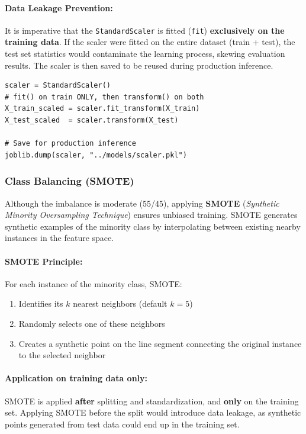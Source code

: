 \documentclass[12pt,a4paper]{article}
\begin{document}
\paragraph{Data Leakage Prevention:} It is imperative that the \texttt{StandardScaler} is fitted (\texttt{fit}) \textbf{exclusively on the training data}. If the scaler were fitted on the entire dataset (train + test), the test set statistics would contaminate the learning process, skewing evaluation results. The scaler is then saved to be reused during production inference.

\begin{lstlisting}[caption={Standardization with data leakage prevention}]
scaler = StandardScaler()
# fit() on train ONLY, then transform() on both
X_train_scaled = scaler.fit_transform(X_train)
X_test_scaled  = scaler.transform(X_test)

# Save for production inference
joblib.dump(scaler, "../models/scaler.pkl")
\end{lstlisting}

\subsubsection{Class Balancing (SMOTE)}
\label{sec:smote}

Although the imbalance is moderate (55/45), applying \textbf{SMOTE} (\textit{Synthetic Minority Oversampling Technique}) ensures unbiased training. SMOTE generates synthetic examples of the minority class by interpolating between existing nearby instances in the feature space.

\paragraph{SMOTE Principle:} For each instance of the minority class, SMOTE:
\begin{enumerate}
    \item Identifies its $k$ nearest neighbors (default $k=5$)
    \item Randomly selects one of these neighbors
    \item Creates a synthetic point on the line segment connecting the original instance to the selected neighbor
\end{enumerate}

\paragraph{Application on training data only:} SMOTE is applied \textbf{after} splitting and standardization, and \textbf{only} on the training set. Applying SMOTE before the split would introduce data leakage, as synthetic points generated from test data could end up in the training set.
\end{document}
